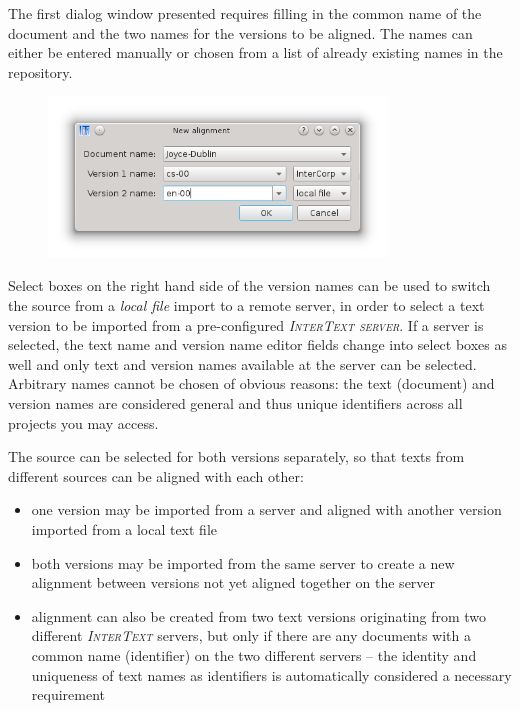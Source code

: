 \documentclass[a4paper,10pt,oneside]{book}
\newcommand{\IT}{\textit{\textsc{InterText}}\xspace}
\newcommand{\ITserver}{\textit{\textsc{InterText server}}\xspace}
\begin{document}
The first dialog window presented requires filling in the common name of the document and the two names for the versions to be aligned. The names can either be entered manually or chosen from a list of already existing names in the repository.

\begin{figure}[htb]
 \includegraphics[width=0.8\textwidth]{screenshots/new_alignment.png}
\end{figure}

Select boxes on the right hand side of the version names can be used to switch the source from a \emph{local file} import to a remote server, in order to select a text version to be imported from a pre-configured \ITserver. If a server is selected, the text name and version name editor fields change into select boxes as well and only text and version names available at the server can be selected. Arbitrary names cannot be chosen of obvious reasons: the text (document) and version names are considered general and thus unique identifiers across all projects you may access.

The source can be selected for both versions separately, so that texts from different sources can be aligned with each other:

\begin{itemize}
 \item one version may be imported from a server and aligned with another version imported from a local text file
 \item both versions may be imported from the same server to create a new alignment between versions not yet aligned together on the server
 \item alignment can also be created from two text versions originating from two different \IT servers, but only if there are any documents with a common name (identifier) on the two different servers -- the identity and uniqueness of text names as identifiers is automatically considered a necessary requirement
\end{itemize}
\end{document}
